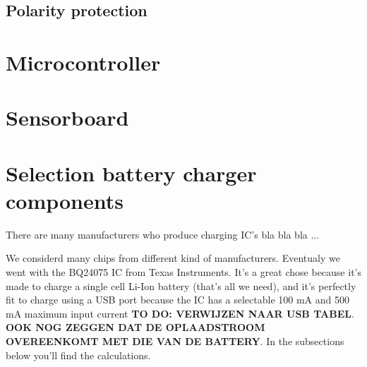\documentclass[11pt,a4paper]{article}
\begin{document}
\subsection{Polarity protection}
\section{Microcontroller}
\section{Sensorboard}



\section{Selection battery charger components}
There are many manufacturers who produce charging IC's  bla bla bla ...

We considerd many chips from different kind of manufacturers. Eventualy we went with the BQ24075 IC from Texas Instruments. It's a great chose because it's made to charge a single cell Li-Ion battery (that's all we need), and it's perfectly fit to charge using a USB port because the IC has a selectable 100 mA and 500 mA maximum input current \textbf{TO DO: VERWIJZEN NAAR USB TABEL}. \textbf{OOK NOG ZEGGEN DAT DE OPLAADSTROOM OVEREENKOMT MET DIE VAN DE BATTERY}. In the subsections below you'll find the calculations.
\end{document}

